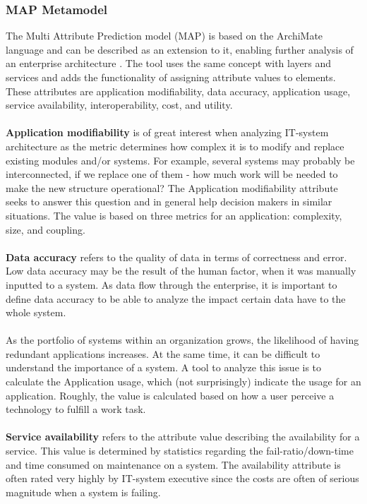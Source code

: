 \subsubsection{MAP Metamodel}
\label{sec:map_metamodel}
The Multi Attribute Prediction model (MAP) is based on the ArchiMate language and can be described as an extension to it, enabling further analysis of an enterprise architecture \cite{map}. The tool uses the same concept with layers and services and adds the functionality of assigning attribute values to elements. These attributes are application modifiability, data accuracy, application usage, service availability, interoperability, cost, and utility.\\\\
%
\textbf{Application modifiability} is of great interest when analyzing IT-system architecture as the metric determines how complex it is to modify and replace existing modules and/or systems. For example, several systems may probably be interconnected, if we replace one of them - how much work will be needed to make the new structure operational? The Application modifiability attribute seeks to answer this question and in general help decision makers in similar situations. The value is based on three metrics for an application: complexity, size, and coupling.\\\\
%
\textbf{Data accuracy} refers to the quality of data in terms of correctness and error. Low data accuracy may be the result of the human factor, when it was manually inputted to a system. As data flow through the enterprise, it is important to define data accuracy to be able to analyze the impact certain data have to the whole system.\\\\
%
As the portfolio of systems within an organization grows, the likelihood of having redundant applications increases. At the same time, it can be difficult to understand the importance of a system. A tool to analyze this issue is to calculate the Application usage, which (not surprisingly) indicate the usage for an application. Roughly, the value is calculated based on how a user perceive a technology to fulfill a work task.\\\\
%
\textbf{Service availability} refers to the attribute value describing the availability for a service. This value is determined by statistics regarding the fail-ratio/down-time and time consumed on maintenance on a system. The availability attribute is often rated very highly by IT-system executive since the costs are often of serious magnitude when a system is failing.\\\\

